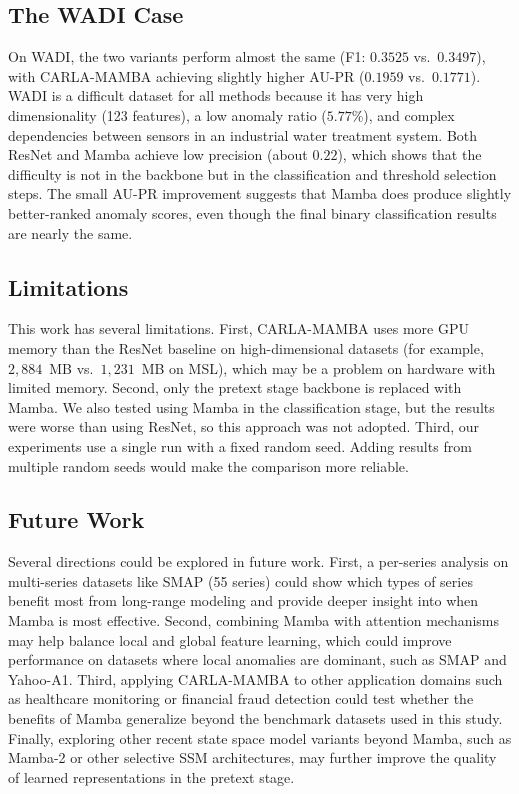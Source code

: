 \documentclass{svproc}
\begin{document}
\subsection{The WADI Case}

On WADI, the two variants perform almost the same (F1: $0.3525$ vs.\ $0.3497$), with CARLA-MAMBA achieving slightly higher AU-PR ($0.1959$ vs.\ $0.1771$). WADI is a difficult dataset for all methods because it has very high dimensionality (123 features), a low anomaly ratio ($5.77\%$), and complex dependencies between sensors in an industrial water treatment system. Both ResNet and Mamba achieve low precision (about $0.22$), which shows that the difficulty is not in the backbone but in the classification and threshold selection steps. The small AU-PR improvement suggests that Mamba does produce slightly better-ranked anomaly scores, even though the final binary classification results are nearly the same.

\subsection{Limitations}

This work has several limitations. First, CARLA-MAMBA uses more GPU memory than the ResNet baseline on high-dimensional datasets (for example, $2{,}884$~MB vs.\ $1{,}231$~MB on MSL), which may be a problem on hardware with limited memory. Second, only the pretext stage backbone is replaced with Mamba. We also tested using Mamba in the classification stage, but the results were worse than using ResNet, so this approach was not adopted. Third, our experiments use a single run with a fixed random seed. Adding results from multiple random seeds would make the comparison more reliable.

\subsection{Future Work}

Several directions could be explored in future work. First, a per-series analysis on multi-series datasets like SMAP (55 series) could show which types of series benefit most from long-range modeling and provide deeper insight into when Mamba is most effective. Second, combining Mamba with attention mechanisms may help balance local and global feature learning, which could improve performance on datasets where local anomalies are dominant, such as SMAP and Yahoo-A1. Third, applying CARLA-MAMBA to other application domains such as healthcare monitoring or financial fraud detection could test whether the benefits of Mamba generalize beyond the benchmark datasets used in this study. Finally, exploring other recent state space model variants beyond Mamba, such as Mamba-2 or other selective SSM architectures, may further improve the quality of learned representations in the pretext stage.
\end{document}
